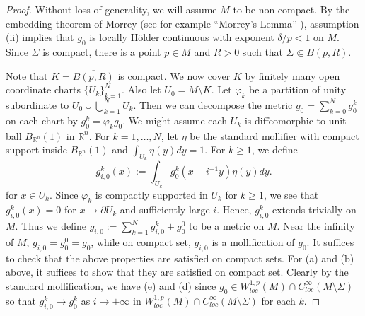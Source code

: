 \documentclass[12pt]{amsart}
\theoremstyle{plain}
\theoremstyle{plain}
\theoremstyle{definition}
\theoremstyle{remark}
\numberwithin{equation}{subsection}
\newcommand{\hdel}{\tilde{\nabla}}
\begin{document}
\begin{proof}
%

Without loss of generality, we will assume $M$ to be non-compact.  By the embedding theorem of Morrey (see for example ``Morrey's Lemma''  \cite[(1.3) ]{adams_morrey_2015}), assumption (ii) implies that $g_0$ is locally H\"older continuous with exponent $\delta/p < 1$ on $M$.  Since $\Sigma$ is compact, there is a point $p \in M$ and $R > 0$ such that $\Sigma \Subset B(p,R)$. 


Note that $K=\overline{B(p,R)}$ is compact. We now cover $K$ by finitely many open coordinate charts $\{U_k\}_{k=1}^N$. Also let $U_0 = M \setminus K$. Let $\varphi_k$ be a partition of unity subordinate to $U_0 \cup \bigcup\limits_{k=1}^N U_k$. Then we can decompose the metric $g_0=\sum_{k=0}^N g^k_0$ on each chart by $g_0^k = \varphi_k g_0$. 
We might assume each $U_k$ is diffeomorphic to unit ball $B_{\mathbb{R}^n}(1)$ in $\mathbb{R}^n$. For $k = 1,\dots,N$, let $\eta$ be the standard mollifier with compact support inside $B_{\mathbb{R}^n}(1)$ and $\int_{U_k} \eta(y)dy = 1$. For $k\geq 1$, we define
    \begin{equation*}
        g_{i,0}^k(x) := \int_{U_k} g_0^k(x-i^{-1}y)\eta(y)dy.
    \end{equation*}
    for $x\in U_k$. Since $\varphi_k$ is compactly supported in $U_k$ for $k\geq 1$, we see that $g^k_{i,0}(x)=0$ for $x\to \partial U_k$ and sufficiently large $i$. Hence, $g^k_{i,0}$ extends trivially on $M$. Thus we define
$
        g_{i,0}:= \sum\limits_{k=1}^N g_{i,0}^k + g_0^0$ to be a metric on $M$.
  Near the infinity of $M$, $g_{i,0}=g_0^0=g_0$, while on compact set, $g_{i,0}$ is a mollification of $g_0$. It suffices to check that the above properties are satisfied on compact sets. For (a) and (b) above, it suffices to show that they are satisfied on compact set. Clearly by the standard mollification, we have (e) and (d) since $g_0\in W^{1,p}_{loc}(M)\cap C^\infty_{loc}(M\setminus \Sigma)$ so that $g_{i,0}^k\to g_0^k$ as $i\to+\infty$ in  $W^{1,p}_{loc}(M)\cap C^\infty_{loc}(M\setminus \Sigma)$ for each $k$.
    

\end{proof}
\end{document}

